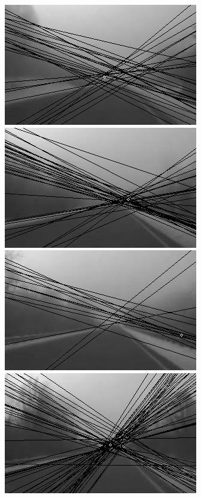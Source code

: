 \documentclass[12pt]{report}
\begin{document}
\begin{figure}
\begin{minipage}[c]{0.5\linewidth}
	\includegraphics[scale=\imTrackScale]{images/bF_0000_15.png}
	\includegraphics[scale=\imTrackScale]{images/bF_0020_15.png}
	\includegraphics[scale=\imTrackScale]{images/bF_0040_15.png}
	\includegraphics[scale=\imTrackScale]{images/bF_0060_15.png}
\end{minipage}
\begin{minipage}[c]{0.5\linewidth}

\end{minipage}
\end{figure}
\end{document}
